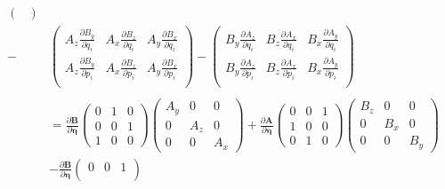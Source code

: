 \documentclass[a4paper]{article}
\begin{document}
\begin{answer}[Punto 23]
\begin{align*}
\begin{pmatrix}
        \end{pmatrix}\\
        -&\begin{pmatrix}
            A_z \frac{\partial  B_y}{\partial q_{i}}   &  A_x \frac{\partial  B_z}{\partial q_{i}}   &  A_y \frac{\partial  B_x}{\partial q_{i}}   \\
              A_z \frac{\partial  B_y}{\partial p_{i}}   &  A_x \frac{\partial  B_z}{\partial p_{i}}   &  A_y \frac{\partial  B_x}{\partial p_{i}}   \\
        \end{pmatrix} - \begin{pmatrix}
            B_y \frac{\partial  A_z}{\partial q_{i}}   &  B_z \frac{\partial  A_x}{\partial q_{i}}   &  B_x \frac{\partial  A_y}{\partial q_{i}}   \\
              B_y \frac{\partial  A_z}{\partial p_{i}}   &  B_z \frac{\partial  A_x}{\partial p_{i}}   &  B_x \frac{\partial  A_y}{\partial p_{i}}   \\
        \end{pmatrix}\\\\
        & = \frac{\partial \mathbf B}{\partial \pmb \eta} \begin{pmatrix}
            0 & 1 & 0\\
            0 & 0 & 1\\
            1 & 0 & 0
        \end{pmatrix}  \begin{pmatrix}
            A_y & 0 & 0\\
            0 & A_z & 0\\
            0 & 0 & A_x
        \end{pmatrix}   +  \frac{\partial \mathbf A}{\partial \pmb \eta}\begin{pmatrix}
            0 & 0 & 1\\
            1 & 0 & 0\\
            0 & 1 & 0
        \end{pmatrix} \begin{pmatrix}
            B_z & 0 & 0\\
            0 & B_x & 0\\
            0 & 0 & B_y
        \end{pmatrix}\\
        &- \frac{\partial \mathbf B}{\partial \pmb \eta}\begin{pmatrix}
            0 & 0 & 1\\

\end{pmatrix}
\end{align*}
\end{answer}
\end{document}
